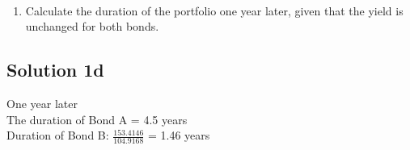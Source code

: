 \documentclass[12]{article}
\begin{document}
\noindent
\\
\color{black}
\color{black}
\begin{enumerate}
    \item[d)] Calculate the duration of the portfolio one year later, given that the yield is unchanged for both bonds.
\end{enumerate}

\color{blue}
\subsection*{Solution 1d}
One year later\\
The duration of Bond A = 4.5 years\\
Duration of Bond B: {\Large $\frac{153.4146}{104.9168}$} = 1.46 years\\

\begin{table}[H]
\centering
{}

\label{tab:my-table}
\end{table}
\end{document}
